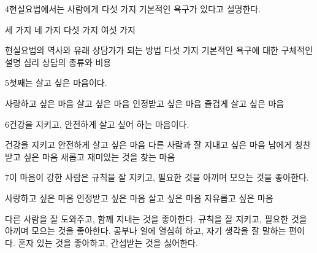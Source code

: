 \documentclass[fs85,seriesRus]{korfarm-base}
\begin{document}
\begin{kfSentenceUnit}{4}{현실요법에서는 사람에게 다섯 가지 기본적인 욕구가 있다고 설명한다.}
\begin{kfChoices}
\kfChoice 세 가지
\kfChoice 네 가지
\kfChoice 다섯 가지
\kfChoice 여섯 가지
\end{kfChoices}
\begin{kfChoices}
\kfChoice 현실요법의 역사와 유래
\kfChoice 상담가가 되는 방법
\kfChoice 다섯 가지 기본적인 욕구에 대한 구체적인 설명
\kfChoice 심리 상담의 종류와 비용
\end{kfChoices}
\end{kfSentenceUnit}

\begin{kfSentenceUnit}{5}{첫째는 살고 싶은 마음이다.}
\begin{kfChoices}
\kfChoice 사랑하고 싶은 마음
\kfChoice 살고 싶은 마음
\kfChoice 인정받고 싶은 마음
\kfChoice 즐겁게 살고 싶은 마음
\end{kfChoices}
\end{kfSentenceUnit}

\begin{kfSentenceUnit}{6}{건강을 지키고, 안전하게 살고 싶어 하는 마음이다.}
\begin{kfChoices}
\kfChoice 건강을 지키고 안전하게 살고 싶은 마음
\kfChoice 다른 사람과 잘 지내고 싶은 마음
\kfChoice 남에게 칭찬받고 싶은 마음
\kfChoice 새롭고 재미있는 것을 찾는 마음
\end{kfChoices}
\end{kfSentenceUnit}

\begin{kfSentenceUnit}{7}{이 마음이 강한 사람은 규칙을 잘 지키고, 필요한 것을 아끼며 모으는 것을 좋아한다.}
\begin{kfChoices}
\kfChoice 사랑하고 싶은 마음
\kfChoice 인정받고 싶은 마음
\kfChoice 살고 싶은 마음
\kfChoice 자유롭고 싶은 마음
\end{kfChoices}
\begin{kfChoices}
\kfChoice 다른 사람을 잘 도와주고, 함께 지내는 것을 좋아한다.
\kfChoice 규칙을 잘 지키고, 필요한 것을 아끼며 모으는 것을 좋아한다.
\kfChoice 공부나 일에 열심히 하고, 자기 생각을 잘 말하는 편이다.
\kfChoice 혼자 있는 것을 좋아하고, 간섭받는 것을 싫어한다.
\end{kfChoices}
\end{kfSentenceUnit}
\end{document}
